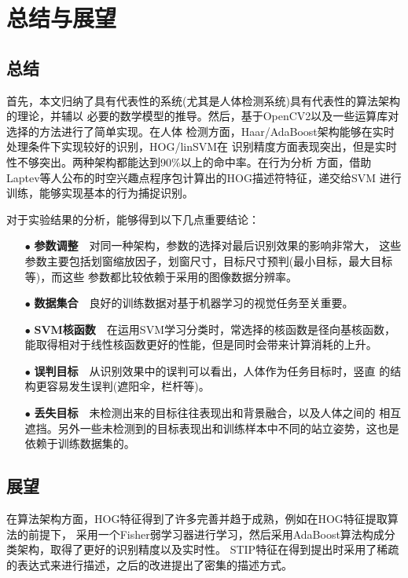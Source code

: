 \chapter{总结与展望}
\section{总结}
首先，本文归纳了具有代表性的系统(尤其是人体检测系统)具有代表性的算法架构的理论，并辅以
必要的数学模型的推导。然后，基于OpenCV2以及一些运算库对选择的方法进行了简单实现。在人体
检测方面，Haar/AdaBoost\cite{haar}架构能够在实时处理条件下实现较好的识别，HOG/linSVM在
识别精度方面表现突出，但是实时性不够突出。两种架构都能达到90\%以上的命中率。在行为分析
方面，借助Laptev等人公布的时空兴趣点\cite{stip}程序包计算出的HOG描述符特征，递交给SVM
进行训练，能够实现基本的行为捕捉识别。

对于实验结果的分析，能够得到以下几点重要结论：
\begin{enumerate}
    \item[$\bullet$] \textbf{参数调整}~~对同一种架构，参数的选择对最后识别效果的影响非常大，
        这些参数主要包括划窗缩放因子，划窗尺寸，目标尺寸预判(最小目标，最大目标等)，而这些
        参数都比较依赖于采用的图像数据分辨率。
    \item[$\bullet$] \textbf{数据集合}~~良好的训练数据对基于机器学习的视觉任务至关重要。
    \item[$\bullet$] \textbf{SVM核函数}~~在运用SVM学习分类时，常选择的核函数是径向基核函数，
        能取得相对于线性核函数更好的性能，但是同时会带来计算消耗的上升。
    \item[$\bullet$] \textbf{误判目标}~~从识别效果中的误判可以看出，人体作为任务目标时，竖直
        的结构更容易发生误判(遮阳伞，栏杆等)。
    \item[$\bullet$] \textbf{丢失目标}~~未检测出来的目标往往表现出和背景融合，以及人体之间的
        相互遮挡。另外一些未检测到的目标表现出和训练样本中不同的站立姿势，这也是依赖于训练数据集的。
\end{enumerate}
\section{展望}
在算法架构方面，HOG特征得到了许多完善并趋于成熟，例如\cite{boostedHOG}在HOG特征提取算法的前提下，
采用一个Fisher弱学习器进行学习，然后采用AdaBoost算法构成分类架构，取得了更好的识别精度以及实时性。
STIP特征在得到提出时\cite{stip}采用了稀疏的表达式来进行描述，之后的改进提出了密集的描述方式。


